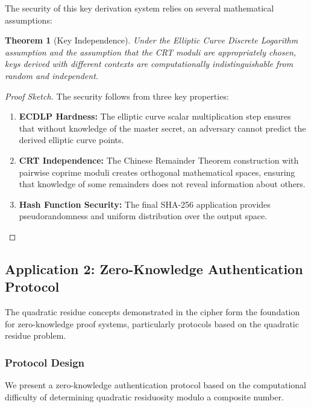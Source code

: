 \documentclass[12pt,a4paper]{article}
\newtheorem{theorem}{Theorem}[section]
\begin{document}
The security of this key derivation system relies on several mathematical assumptions:

\begin{theorem}[Key Independence]
Under the Elliptic Curve Discrete Logarithm assumption and the assumption that the CRT moduli are appropriately chosen, keys derived with different contexts are computationally indistinguishable from random and independent.
\end{theorem}

\begin{proof}[Proof Sketch]
The security follows from three key properties:

\begin{enumerate}
    \item \textbf{ECDLP Hardness:} The elliptic curve scalar multiplication step ensures that without knowledge of the master secret, an adversary cannot predict the derived elliptic curve points.
    
    \item \textbf{CRT Independence:} The Chinese Remainder Theorem construction with pairwise coprime moduli creates orthogonal mathematical spaces, ensuring that knowledge of some remainders does not reveal information about others.
    
    \item \textbf{Hash Function Security:} The final SHA-256 application provides pseudorandomness and uniform distribution over the output space.
\end{enumerate}
\end{proof}

\subsection{Application 2: Zero-Knowledge Authentication Protocol}

The quadratic residue concepts demonstrated in the cipher form the foundation for zero-knowledge proof systems, particularly protocols based on the quadratic residue problem.

\subsubsection{Protocol Design}

We present a zero-knowledge authentication protocol based on the computational difficulty of determining quadratic residuosity modulo a composite number.
\end{document}
